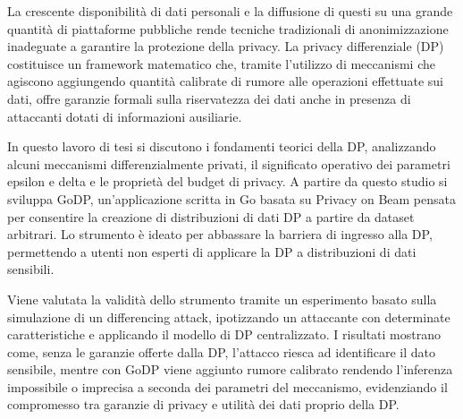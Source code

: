 La crescente disponibilità di dati personali e la diffusione di questi su una grande quantità di piattaforme pubbliche rende tecniche tradizionali di anonimizzazione inadeguate a garantire la protezione della privacy.
La privacy differenziale (DP) costituisce un framework matematico che, tramite l'utilizzo di meccanismi che agiscono aggiungendo quantità calibrate di rumore alle operazioni effettuate sui dati, offre garanzie formali sulla riservatezza dei dati anche in presenza di attaccanti dotati di informazioni ausiliarie.

In questo lavoro di tesi si discutono i fondamenti teorici della DP, analizzando alcuni meccanismi differenzialmente privati, il significato operativo dei parametri epsilon e delta e le proprietà del budget di privacy. A partire da questo studio si sviluppa GoDP, un'applicazione scritta in Go basata su Privacy on Beam pensata per consentire la creazione di distribuzioni di dati DP a partire da dataset arbitrari. Lo strumento è ideato per abbassare la barriera di ingresso alla DP, permettendo a utenti non esperti di applicare la DP a distribuzioni di dati sensibili.

Viene valutata la validità dello strumento tramite un esperimento basato sulla simulazione di un differencing attack, ipotizzando un attaccante con determinate caratteristiche e applicando il modello di DP centralizzato. I risultati mostrano come, senza le garanzie offerte dalla DP, l'attacco riesca ad identificare il dato sensibile, mentre con GoDP viene aggiunto rumore calibrato rendendo l'inferenza impossibile o imprecisa a seconda dei parametri del meccanismo, evidenziando il compromesso tra garanzie di privacy e utilità dei dati proprio della DP.